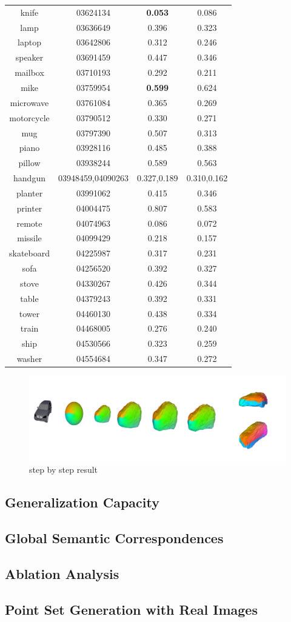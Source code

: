 \begin{table}
\begin{tabular}{c c c c}
		knife & 03624134 & {\color{green} \textbf{0.053}}  & 0.086\\
		lamp & 03636649 & 0.396 & 0.323\\
		laptop & 03642806 & 0.312 & 0.246\\
		speaker & 03691459 & 0.447 & 0.346\\
		mailbox & 03710193 & 0.292 & 0.211\\
		mike & 03759954 & {\color{green} \textbf{0.599}} & 0.624\\
		microwave & 03761084 & 0.365 & 0.269\\
		motorcycle & 03790512 & 0.330 & 0.271\\
		mug & 03797390 & 0.507 & 0.313\\
		piano & 03928116 & 0.485 & 0.388\\
		pillow & 03938244 & 0.589 & 0.563\\
		handgun & 03948459,04090263 & 0.327,0.189 & 0.310,0.162\\
		planter & 03991062 & 0.415 & 0.346\\
		printer & 04004475 & 0.807 & 0.583\\
		remote & 04074963 & 0.086 & 0.072\\
		missile & 04099429 & 0.218 & 0.157\\
		skateboard & 04225987 & 0.317 & 0.231\\
		sofa & 04256520 & 0.392 & 0.327\\
		stove & 04330267 & 0.426 & 0.344\\
		table & 04379243 & 0.392 & 0.331\\
		tower & 04460130 & 0.438 & 0.334\\
		train & 04468005 & 0.276 & 0.240\\
		ship  & 04530566 & 0.323 & 0.259\\
		washer &  04554684 & 0.347 & 0.272\\
	\end{tabular}
	\label{tab:seg}
\end{table}
\begin{figure}[htbp]
	\centering
	\includegraphics[width=\linewidth]{img/KPARAM/stepbystep}
	\caption{step by step result}
	\label{fig:stepbystep}
\end{figure}
\subsection{Generalization Capacity}
\subsection{Global Semantic Correspondences}
\subsection{Ablation Analysis}
\subsection{Point Set Generation with Real Images}